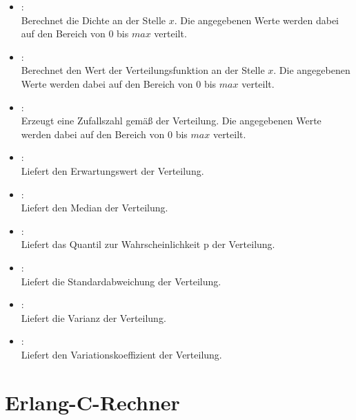\begin{itemize}

\item
{}:\\
Berechnet die Dichte an der Stelle $x$.
Die angegebenen Werte werden dabei auf den Bereich von 0 bis $max$ verteilt.

\item
{}:\\
Berechnet den Wert der Verteilungsfunktion an der Stelle $x$.
Die angegebenen Werte werden dabei auf den Bereich von 0 bis $max$ verteilt.

\item
{}:\\
Erzeugt eine Zufallszahl gemäß der Verteilung.
Die angegebenen Werte werden dabei auf den Bereich von 0 bis $max$ verteilt.

\item
{}:\\
Liefert den Erwartungswert der Verteilung.

\item
{}:\\
Liefert den Median der Verteilung.

\item
{}:\\
Liefert das Quantil zur Wahrscheinlichkeit p der Verteilung.

\item
{}:\\
Liefert die Standardabweichung der Verteilung.

\item
{}:\\
Liefert die Varianz der Verteilung.

\item
{}:\\
Liefert den Variationskoeffizient der Verteilung.

\end{itemize}



\chapter{Erlang-C-Rechner}

